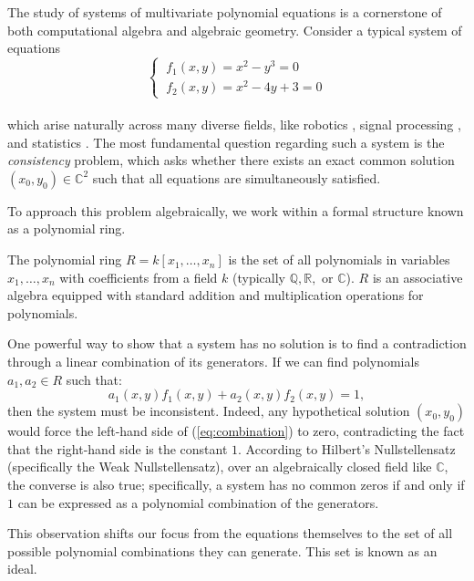 The study of systems of multivariate polynomial equations is a cornerstone of both computational algebra and algebraic geometry. Consider a typical system of equations
\begin{equation}
\label{eq:system1}
\begin{cases}
    \ f_{1}(x,y) = x^{2} - y^{3} = 0 \\
    \ f_{2}(x,y) = x^{2} - 4y + 3 = 0
\end{cases}
\end{equation} \\
which arise naturally across many diverse fields, like robotics \cite{usage_robotics1}, signal processing \cite{usage_signalprocessing1}, and statistics \cite{usage_stats1,usage_stats2}. The most fundamental question regarding such a system is the \textit{consistency} problem, which asks whether there exists an exact common solution $(x_0, y_0) \in \mathbb{C}^2$ such that all equations are simultaneously satisfied.

To approach this problem algebraically, we work within a formal structure known as a polynomial ring.

\begin{definition}
\label{def:poly_ring}
The polynomial ring $R = k[x_1, \dots, x_n]$ is the set of all polynomials in variables $x_1, \dots, x_n$ with coefficients from a field $k$ (typically $\mathbb{Q}, \mathbb{R},$ or $\mathbb{C}$). $R$ is an associative algebra equipped with standard addition and multiplication operations for polynomials.
\end{definition}

One powerful way to show that a system has no solution is to find a contradiction through a linear combination of its generators. If we can find polynomials $a_1, a_2 \in R$ such that:
\begin{equation}
\label{eq:combination}
a_{1}(x,y)f_{1}(x,y) + a_{2}(x,y)f_{2}(x,y) = 1,
\end{equation}
then the system must be inconsistent. Indeed, any hypothetical solution $(x_0, y_0)$ would force the left-hand side of (\ref{eq:combination}) to zero, contradicting the fact that the right-hand side is the constant $1$. According to Hilbert's Nullstellensatz (specifically the Weak Nullstellensatz), over an algebraically closed field like $\mathbb{C}$, the converse is also true; specifically, a system has no common zeros if and only if $1$ can be expressed as a polynomial combination of the generators.

This observation shifts our focus from the equations themselves to the set of all possible polynomial combinations they can generate. This set is known as an ideal.

